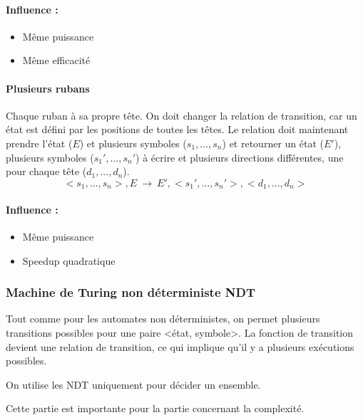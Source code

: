\paragraph{Influence :} 
\begin{itemize}
	\item Même puissance
	\item Même efficacité
\end{itemize}

\paragraph{Plusieurs rubans} Chaque ruban à sa propre tête.
On doit changer la relation de transition, car un état est défini par les positions
de toutes les têtes. Le relation doit maintenant prendre l'état ($E$) et plusieurs 
symboles ($s_1,...,s_n$) et retourner un état ($E'$), plusieurs symboles 
($s_1',...,s_n'$) à écrire et plusieurs directions différentes, une pour chaque tête 
($d_1,...,d_n$).
$$ <s_1,...,s_n>, E \ \rightarrow \ E', <s_1',...,s_n'>, <d_1,...,d_n> $$
\paragraph{Influence :} 
\begin{itemize}
	\item Même puissance
	\item Speedup quadratique
\end{itemize}

\subsubsection{Machine de Turing non déterministe NDT}
Tout comme pour les automates non déterministes, on permet plusieurs 
transitions possibles pour une paire <état, symbole>. La fonction de transition
devient une relation de transition, ce qui implique qu'il y a plusieurs
 exécutions possibles.

\begin{myrem}
	On utilise les NDT uniquement pour décider un ensemble.
\end{myrem}

\begin{myrem}
	Cette partie est importante pour la partie concernant la complexité.
\end{myrem}

